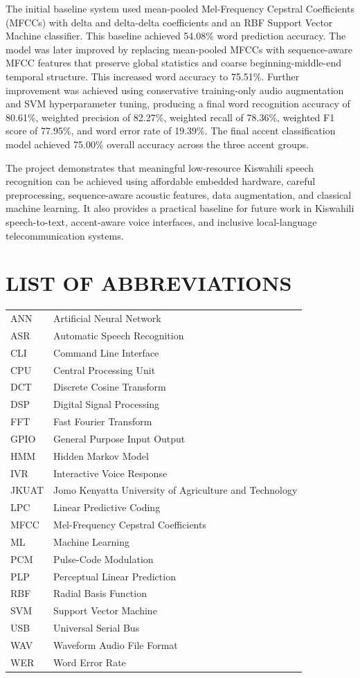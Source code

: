 \documentclass[12pt,a4paper]{report}
\begin{document}
The initial baseline system used mean-pooled Mel-Frequency Cepstral Coefficients (MFCCs) with delta and delta-delta coefficients and an RBF Support Vector Machine classifier. This baseline achieved 54.08\% word prediction accuracy. The model was later improved by replacing mean-pooled MFCCs with sequence-aware MFCC features that preserve global statistics and coarse beginning-middle-end temporal structure. This increased word accuracy to 75.51\%. Further improvement was achieved using conservative training-only audio augmentation and SVM hyperparameter tuning, producing a final word recognition accuracy of 80.61\%, weighted precision of 82.27\%, weighted recall of 78.36\%, weighted F1 score of 77.95\%, and word error rate of 19.39\%. The final accent classification model achieved 75.00\% overall accuracy across the three accent groups.

The project demonstrates that meaningful low-resource Kiswahili speech recognition can be achieved using affordable embedded hardware, careful preprocessing, sequence-aware acoustic features, data augmentation, and classical machine learning. It also provides a practical baseline for future work in Kiswahili speech-to-text, accent-aware voice interfaces, and inclusive local-language telecommunication systems.

\tableofcontents
\listoffigures
\listoftables

\chapter*{LIST OF ABBREVIATIONS}
\begin{longtable}{ll}
ANN & Artificial Neural Network\\
ASR & Automatic Speech Recognition\\
CLI & Command Line Interface\\
CPU & Central Processing Unit\\
DCT & Discrete Cosine Transform\\
DSP & Digital Signal Processing\\
FFT & Fast Fourier Transform\\
GPIO & General Purpose Input Output\\
HMM & Hidden Markov Model\\
IVR & Interactive Voice Response\\
JKUAT & Jomo Kenyatta University of Agriculture and Technology\\
LPC & Linear Predictive Coding\\
MFCC & Mel-Frequency Cepstral Coefficients\\
ML & Machine Learning\\
PCM & Pulse-Code Modulation\\
PLP & Perceptual Linear Prediction\\
RBF & Radial Basis Function\\
SVM & Support Vector Machine\\
USB & Universal Serial Bus\\
WAV & Waveform Audio File Format\\
WER & Word Error Rate\\
\end{longtable}
\end{document}

